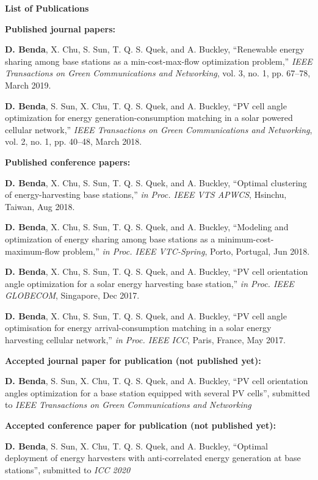  \clearpage
{}

\begin{center}
\Huge\textbf{{List of Publications}}
\end{center}


\vspace{\baselineskip}
\textbf{Published journal papers:}

 \cite{8491374} \textbf{D. Benda}, X. Chu, S. Sun, T. Q. S. Quek, and A. Buckley, “Renewable energy sharing among base stations as a min-cost-max-flow optimization problem,” \textit{IEEE Transactions on Green Communications and Networking}, vol. 3, no. 1, pp. 67–78, March 2019.

 \cite{my} \textbf{D. Benda}, S. Sun, X. Chu, T. Q. S. Quek, and A. Buckley, “PV cell angle optimization for energy generation-consumption matching in a solar powered cellular network,” \textit{IEEE Transactions on Green Communications and Networking}, vol. 2, no. 1, pp. 40–48, March 2018.

\vspace{\baselineskip}
\textbf{Published conference papers:}

\cite{APWCS} \textbf{D. Benda}, X. Chu, S. Sun, T. Q. S. Quek, and A. Buckley, “Optimal clustering of energy-harvesting base stations,” \textit{in Proc. IEEE VTS APWCS}, Hsinchu, Taiwan, Aug 2018.  

  \cite{my_con3} \textbf{D. Benda}, X. Chu, S. Sun, T. Q. S. Quek, and A. Buckley, “Modeling and optimization of energy sharing among base stations as a minimum-cost-maximum-flow problem,” \textit{in Proc. IEEE VTC-Spring}, Porto, Portugal, Jun 2018.
	
 \cite{my2} \textbf{D. Benda}, X. Chu, S. Sun, T. Q. S. Quek, and A. Buckley, “PV cell orientation angle optimization for a solar energy harvesting base station,” \textit{in Proc. IEEE GLOBECOM}, Singapore, Dec 2017.

 \cite{my4} \textbf{D. Benda}, X. Chu, S. Sun, T. Q. S. Quek, and A. Buckley, “PV cell angle optimisation for energy arrival-consumption matching in a solar energy harvesting cellular network,” \textit{in Proc. IEEE ICC}, Paris, France, May 2017.


\vspace{\baselineskip}
\vspace{4cm}
\textbf{Accepted journal paper for publication (not published yet):}

 \cite{sub} \textbf{D. Benda}, S. Sun, X. Chu, T. Q. S. Quek, and A. Buckley, “PV cell orientation angles optimization for a base station equipped with several PV cells”, submitted to \textit{IEEE Transactions on Green Communications and Networking}

\vspace{\baselineskip}
\textbf{Accepted conference paper for publication (not published yet):}

\cite{sub2} \textbf{D. Benda}, S. Sun, X. Chu, T. Q. S. Quek, and A. Buckley, “Optimal deployment of energy harvesters with anti-correlated energy generation
at base stations”, submitted to \textit{ICC 2020}
